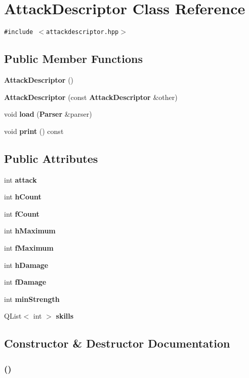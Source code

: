 \section{Attack\-Descriptor Class Reference}
\label{classAttackDescriptor}
{\tt \#include $<$attackdescriptor.hpp$>$}

\subsection*{Public Member Functions}
\begin{CompactItemize}
\item 
{\bf Attack\-Descriptor} ()
\item 
{\bf Attack\-Descriptor} (const {\bf Attack\-Descriptor} \&other)
\item 
void {\bf load} ({\bf Parser} \&parser)
\item 
void {\bf print} () const 
\end{CompactItemize}
\subsection*{Public Attributes}
\begin{CompactItemize}
\item 
int {\bf attack}
\item 
int {\bf h\-Count}
\item 
int {\bf f\-Count}
\item 
int {\bf h\-Maximum}
\item 
int {\bf f\-Maximum}
\item 
int {\bf h\-Damage}
\item 
int {\bf f\-Damage}
\item 
int {\bf min\-Strength}
\item 
QList$<$ int $>$ {\bf skills}
\end{CompactItemize}


\subsection{Constructor \& Destructor Documentation}
\subsubsection{ ()}\label{classAttackDescriptor_a0}


